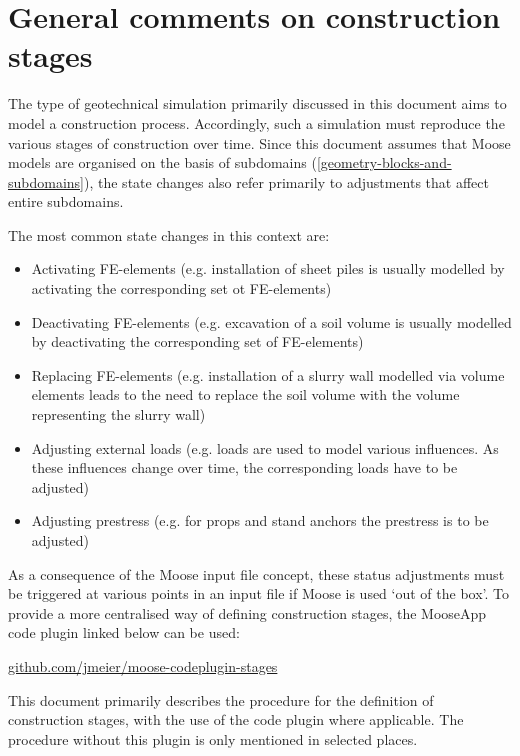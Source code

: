\section{General comments on construction stages}
\label{chap:stages-general}

The type of geotechnical simulation primarily discussed in this document aims
to model a construction process. Accordingly, such a simulation must reproduce
the various stages of construction over time. Since this document assumes that
Moose models are organised on the basis of subdomains
(\autoref{geometry-blocks-and-subdomains}), the state changes also refer
primarily to adjustments that affect entire subdomains.

The most common state changes in this context are:

\begin{itemize}
      \item Activating FE-elements (e.g. installation of sheet piles is usually modelled by
            activating the corresponding set ot FE-elements)
      \item Deactivating FE-elements (e.g. excavation of a soil volume is usually modelled
            by deactivating the corresponding set of FE-elements)
      \item Replacing FE-elements (e.g. installation of a slurry wall modelled via volume
            elements leads to the need to replace the soil volume with the volume
            representing the slurry wall)
      \item Adjusting external loads (e.g. loads are used to model various influences. As
            these influences change over time, the corresponding loads have to be adjusted)
      \item Adjusting prestress (e.g. for props and stand anchors the prestress is to be
            adjusted)
\end{itemize}

As a consequence of the Moose input file concept, these status adjustments must
be triggered at various points in an input file if Moose is used ‘out of the
box’. To provide a more centralised way of defining construction stages, the
\codeword{[Stages]} MooseApp code plugin linked below can be used:

\href{https://github.com/jmeier/moose-codeplugin-stages}{github.com/jmeier/moose-codeplugin-stages}

This document primarily describes the procedure for the definition of
construction stages, with the use of the \codeword{[Stages]} code plugin where
applicable. The procedure without this plugin is only mentioned in selected
places.

